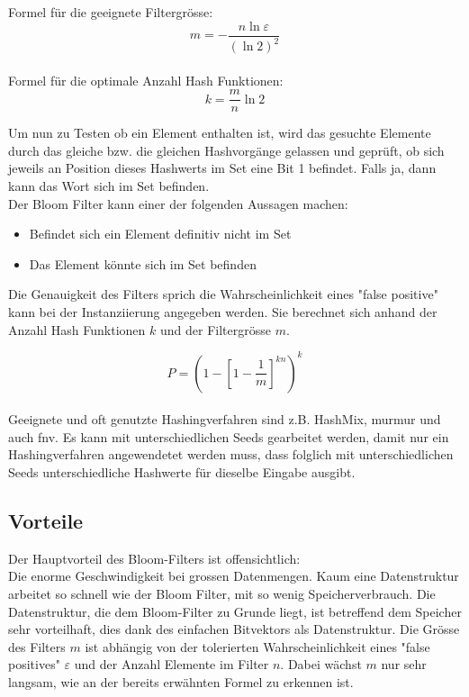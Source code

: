 \documentclass{article}
\begin{document}
    \noindent Formel für die geeignete Filtergrösse:
    $$
    m=-\frac{n \ln \varepsilon}{(\ln 2)^{2}}
    $$
    \\
    Formel für die optimale Anzahl Hash Funktionen:
    $$
    k=\frac{m}{n} \ln 2
    $$

    \vspace{.5cm}

    \noindent Um nun zu Testen ob ein Element enthalten ist, wird das gesuchte Elemente durch das gleiche bzw. die gleichen Hashvorgänge gelassen und geprüft, ob sich jeweils an Position dieses Hashwerts im Set eine Bit 1 befindet. Falls ja, dann kann das Wort sich im Set befinden. \\
    Der Bloom Filter kann einer der folgenden Aussagen machen:
    \begin{itemize}
        \item Befindet sich ein Element definitiv nicht im Set
        \item Das Element könnte sich im Set befinden
    \end{itemize}

    \noindent Die Genauigkeit des Filters sprich die Wahrscheinlichkeit eines "false positive" kann bei der Instanziierung angegeben werden. Sie berechnet sich anhand der Anzahl Hash Funktionen $k$ und der Filtergrösse $m$.

    $$
    P=\left(1-\left[1-\frac{1}{m}\right]^{k n}\right)^{k}
    $$
    \\
    \noindent Geeignete und oft genutzte Hashingverfahren sind z.B. HashMix, murmur und auch fnv. Es kann mit unterschiedlichen Seeds gearbeitet werden, damit nur ein Hashingverfahren angewendetet werden muss, dass folglich mit unterschiedlichen Seeds unterschiedliche Hashwerte für dieselbe Eingabe ausgibt.

    \subsection{Vorteile}
    Der Hauptvorteil des Bloom-Filters ist offensichtlich: \\
    Die enorme Geschwindigkeit bei grossen Datenmengen. Kaum eine Datenstruktur arbeitet so schnell wie der Bloom Filter, mit so wenig Speicherverbrauch. Die Datenstruktur, die dem Bloom-Filter zu Grunde liegt, ist betreffend dem Speicher sehr vorteilhaft, dies dank des einfachen Bitvektors als Datenstruktur. Die Grösse des Filters $m$ ist abhängig von der tolerierten Wahrscheinlichkeit eines "false positives" $\varepsilon$ und der Anzahl Elemente im Filter $n$. Dabei wächst $m$ nur sehr langsam, wie an der bereits erwähnten Formel zu erkennen ist.
\end{document}
